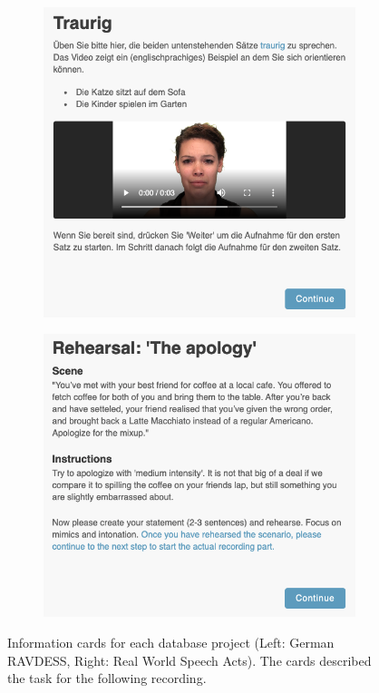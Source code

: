 \begin{figure}
    \centering
    \begin{subfigure}[b]{0.45\textwidth}
      \includegraphics[width=\textwidth]{res/ger_ex.png}
    \end{subfigure}
    \begin{subfigure}[b]{0.45\textwidth}
      \includegraphics[width=\textwidth]{res/impro_ex.png}
    \end{subfigure}
    
    \caption{Information cards for each database project (Left: German RAVDESS, Right: Real World Speech Acts). The cards described the task for the following recording.}
    \label{fig:infocards}
\end{figure}

